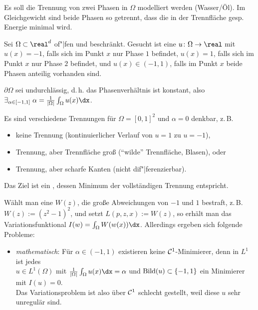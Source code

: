 \begin{Bsp}
    Es soll die Trennung von zwei Phasen in $\Omega$ modelliert werden (Wasser/Öl).
    Im Gleichgewicht sind beide Phasen so getrennt,
    dass die in der Trennfläche gesp. Energie minimal wird.
    
    Sei $\Omega \subset \real^d$ of"|fen und beschränkt.
    Gesucht ist eine  $u\colon \Omega \to \real$ mit\\
    $u(x) = -1$, falls sich im Punkt $x$ nur Phase $1$ befindet,
    $u(x) = 1$, falls sich im Punkt $x$ nur Phase $2$ befindet, und
    $u(x) \in (-1, 1)$, falls im Punkt $x$ beide Phasen anteilig vorhanden sind.
    
    $\partial\Omega$ sei undurchlässig, d.\,h. das Phasenverhältnis ist konstant,
    also
    $\exists_{\alpha \in [-1, 1]}\; \alpha = \frac{1}{|\Omega|} \int_\Omega u(x) \dx$.
    
    Es sind verschiedene Trennungen für $\Omega = [0, 1]^2$ und $\alpha = 0$ denkbar, z.\,B.
    \begin{itemize}
        \item
        keine Trennung (kontinuierlicher Verlauf von $u = 1$ zu $u = -1$),
        
        \item
        Trennung, aber Trennfläche groß ("`wilde"' Trennfläche, Blasen), oder
        
        \item
        Trennung, aber scharfe Kanten (nicht dif"|ferenzierbar).
    \end{itemize}
    Das Ziel ist ein , dessen Minimum der vollständigen Trennung
    entspricht.
    
    Wählt man eine  $W(z)$, die große Abweichungen von $-1$ und $1$
    bestraft, z.\,B. $W(z) := (z^2-1)^2$, und setzt $L(p, z, x) := W(z)$,
    so erhält man das Variationsfunktional $I(w) = \int_\Omega W(w(x)) \dx$.
    Allerdings ergeben sich folgende Probleme:
    \begin{itemize}
        \item
        \emph{mathematisch}:
        Für $\alpha \in (-1, 1)$ existieren keine $\mathcal{C}^1$-Minimierer, denn in $L^1$ ist jedes\\
        $u \in L^1(\Omega)$ mit $\frac{1}{|\Omega|} \int_\Omega u(x) \dx = \alpha$ und
        $\operatorname{Bild}(u) \subset \{-1, 1\}$ ein Minimierer mit $I(u) = 0$.\\
        Das Variationsproblem ist also über $\mathcal{C}^1$ schlecht gestellt,
        weil diese $u$ sehr unregulär sind.
        

\end{itemize}
\end{Bsp}
